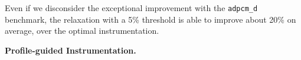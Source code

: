 Even if we disconsider the exceptional improvement with the \texttt{adpcm\_d} benchmark, the relaxation with a 5\% threshold is able to improve about 20\% on average, over the optimal instrumentation.

\textbf{Profile-guided Instrumentation.}

%







